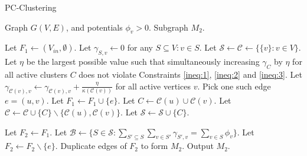 \begin{algorithm}[H]
\caption{PC-Clustering}
\label{algorithm:pc-clustering}
\begin{algorithmic}[1]

\Require Graph \(G(V , E)\), and potentials \(\phi_v > 0\).
\Ensure Subgraph \(M_2\).

\State Let \(F_1 \gets (V_{in}, \emptyset)\).
\State Let \(\gamma_{S, v} \gets 0\) for any \(S \subseteq V : v \in S\).
\State Let \(\mathcal{S} \gets \mathcal{C} \gets \{\{v\}: v \in V\}\).
 \label{alg:line-while}
    \State Let \(\eta\) be the largest possible value such that simultaneously increasing \(\gamma_C\) by \(\eta\) for all active clusters \(C\) does not violate Constraints \eqref{ineq:1}, \eqref{ineq:2} and \eqref{ineq:3}.
    \State Let \(\gamma_{\mathcal{C}(v), v} \gets \gamma_{\mathcal{C}(v), v} + \frac{\eta}{\kappa(\mathcal{C}(v))}\) for all active vertices \(v\).
        \State Pick one such edge \(e = (u, v)\).
        \State Let \(F_1 \gets F_1 \cup \{e\}\).
        \State Let \(C \gets \mathcal{C}(u) \cup \mathcal{C}(v)\).
        \State Let \(\mathcal{C} \gets \mathcal{C} \cup \{C\} \backslash \{ \mathcal{C}(u), \mathcal{C}(v) \}\).
        \State Let \(\mathcal{S} \gets \mathcal{S} \cup \{C\}\).
    \EndIf
\EndWhile

\State Let \(F_2 \gets F_1\).
\State Let \(\mathcal{B} \gets \{S \in \mathcal{S} : \sum_{S' \subseteq S} \sum_{v \in S'} \gamma_{S', v} = \sum_{v \in S} \phi_v\}\).
    \State Let \(F_2 \gets F_2 \backslash \{e\}\).
\EndWhile
\State Duplicate edges of \(F_2\) to form \(M_2\).
\State Output \(M_2\).

\end{algorithmic}
\end{algorithm}

